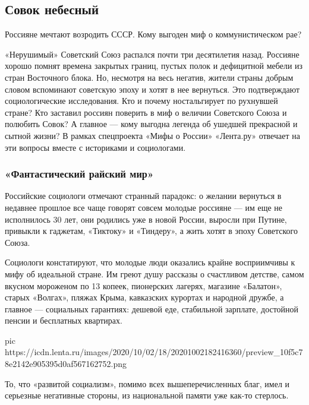  
 

\subsection{Совок небесный}
\label{sec:20_10_2020.news.ru.lenta.1.sovok_nebesnii}

Россияне мечтают возродить СССР. Кому выгоден миф о коммунистическом рае?

«Нерушимый» Советский Союз распался почти три десятилетия назад. Россияне
хорошо помнят времена закрытых границ, пустых полок и дефицитной мебели из
стран Восточного блока. Но, несмотря на весь негатив, жители страны добрым
словом вспоминают советскую эпоху и хотят в нее вернуться. Это подтверждают
социологические исследования. Кто и почему ностальгирует по рухнувшей стране?
Кто заставил россиян поверить в миф о величии Советского Союза и полюбить
Совок? А главное --- кому выгодна легенда об ушедшей прекрасной и сытной жизни? В
рамках спецпроекта «Мифы о России» «Лента.ру» отвечает на эти вопросы вместе с
историками и социологами.

\subsubsection{«Фантастический райский мир»}

Российские социологи отмечают странный парадокс: о желании вернуться в недавнее
прошлое все чаще говорят совсем молодые россияне --- им еще не исполнилось 30
лет, они родились уже в новой России, выросли при Путине, привыкли к гаджетам,
«Тиктоку» и «Тиндеру», а жить хотят в эпоху Советского Союза.

Социологи констатируют, что молодые люди оказались крайне восприимчивы к мифу
об идеальной стране. Им греют душу рассказы о счастливом детстве, самом вкусном
мороженом по 13 копеек, пионерских лагерях, магазине «Балатон», старых
«Волгах», пляжах Крыма, кавказских курортах и народной дружбе, а главное —
социальных гарантиях: дешевой еде, стабильной зарплате, достойной пенсии и
бесплатных квартирах.

\ifcmt
pic https://icdn.lenta.ru/images/2020/10/02/18/20201002182416360/preview_10f5c78e2142e905395d0af567162752.png
\fi

То, что «развитой социализм», помимо всех вышеперечисленных благ, имел и
серьезные негативные стороны, из национальной памяти уже как-то стерлось.

